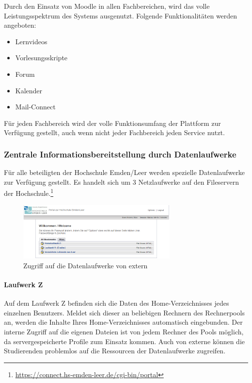 Durch den Einsatz von Moodle in allen Fachbereichen, wird das volle Leistungsspektrum des Systems ausgenutzt. Folgende Funktionalitäten werden angeboten:
\begin{itemize}
	\item Lernvideos
	\item Vorlesungsskripte
	\item Forum
	\item Kalender
	\item Mail-Connect
\end{itemize}

Für jeden Fachbereich wird der volle Funktionsumfang der Plattform zur Verfügung gestellt, auch wenn nicht jeder Fachbereich jeden Service nutzt.

\subsubsection{Zentrale Informationsbereitstellung durch Datenlaufwerke}
Für alle beteiligten der Hochschule Emden/Leer werden spezielle Datenlaufwerke zur Verfügung gestellt. Es handelt sich um 3 Netzlaufwerke auf den Fileservern der Hochschule.\footnote{\url{https://connect.hs-emden-leer.de/cgi-bin/portal}}

\begin{figure}[h!]
	\centering
	\includegraphics[width=8cm]{kapitel/gruppe2/bilder/zugriff_auf_laufwerke_extern}
	\caption{Zugriff auf die Datenlaufwerke von extern}
	\label{fig_zugriff_datenlaufwerke_extern}
\end{figure}


\paragraph{Laufwerk Z}
Auf dem Laufwerk Z befinden sich die Daten des Home-Verzeichnisses jedes einzelnen Benutzers. Meldet sich dieser an beliebigen Rechnern des Rechnerpools an, werden die Inhalte Ihres Home-Verzeichnisses automatisch eingebunden. Der interne Zugriff auf die eigenen Dateien ist von jedem Rechner des Pools möglich, da servergespeicherte Profile zum Einsatz kommen. Auch von externe können die Studierenden problemlos auf die Ressourcen der Datenlaufwerke zugreifen.

